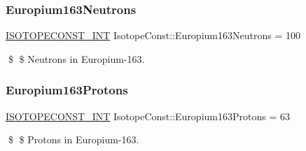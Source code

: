 \subsubsection{\texorpdfstring{Europium163\+Neutrons}{Europium163Neutrons}}
{\footnotesize\ttfamily \mbox{\hyperlink{group___isotope_const-_macros_ga5f18360b3e99483a35c32d789e62621c}{I\+S\+O\+T\+O\+P\+E\+C\+O\+N\+S\+T\+\_\+\+I\+NT}} Isotope\+Const\+::\+Europium163\+Neutrons = 100}

\$ \$ Neutrons in Europium-\/163. \mbox{\label{group___isotope_const-_europium-_eu163_gaa8bb574b08daf2019adbdeabf8c0dcf3}} 
\subsubsection{\texorpdfstring{Europium163\+Protons}{Europium163Protons}}
{\footnotesize\ttfamily \mbox{\hyperlink{group___isotope_const-_macros_ga5f18360b3e99483a35c32d789e62621c}{I\+S\+O\+T\+O\+P\+E\+C\+O\+N\+S\+T\+\_\+\+I\+NT}} Isotope\+Const\+::\+Europium163\+Protons = 63}

\$ \$ Protons in Europium-\/163. 